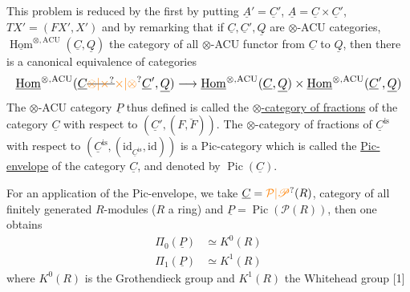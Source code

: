 This problem is reduced by the first by putting $\underline A'=\underline C'$, $\underline A=\underline C\times\underline C'$, $TX'=(FX',X')$ and by remarking that if $\underline C,\underline C',\underline Q$ are $\otimes$-ACU categories, $\underline{\operatorname{Hom}}^{\otimes,\mathrm{ACU}}(\underline C,\underline Q)$ the category of all $\otimes$-ACU functor from $\underline C$ to $\underline Q$, then there is a canonical equivalence of categories
\[
\resizebox{\linewidth}{!}{$\displaystyle
\underline{\operatorname{Hom}}^{\otimes,\mathrm{ACU}}(\underline C\deleted{\unsure{\otimes|\times}}\unsure{\times|\otimes}\underline C',\underline Q)\longrightarrow
\underline{\operatorname{Hom}}^{\otimes,\mathrm{ACU}}(\underline C,\underline Q)\times
\underline{\operatorname{Hom}}^{\otimes,\mathrm{ACU}}(\underline C',\underline Q)$}
\]
The $\otimes$-ACU category $\underline P$ thus defined is called the \uline{$\otimes$-category of fractions} of the category $\underline C$ with respect to $(\underline C',(F,\breve F))$. The $\otimes$-category of fractions of $\underline C^{\mathrm{is}}$ with respect to $(\underline C^{\mathrm{is}},(\mathrm{id}_{\underline C^{\mathrm{is}}},\mathrm{id}))$ is a Pic-category which is called the \uline{Pic-envelope} of the category $\underline C$, and denoted by $\operatorname{Pic}(\underline C)$.

For an application of the Pic-envelope, we take $\underline C=\unsure{\mathcal P|\mathscr P}(R)$, category of all finitely generated $R$-modules ($R$ a ring) and $\underline P=\operatorname{Pic}(\mathcal P(R))$, then one obtains
\[
\begin{aligned}
\Pi_0(\underline P)&\simeq K^0(R)\\
\Pi_1(\underline P)&\simeq K^1(R)
\end{aligned}
\]
where $K^0(R)$ is the Grothendieck group and $K^1(R)$ the Whitehead group [1]

